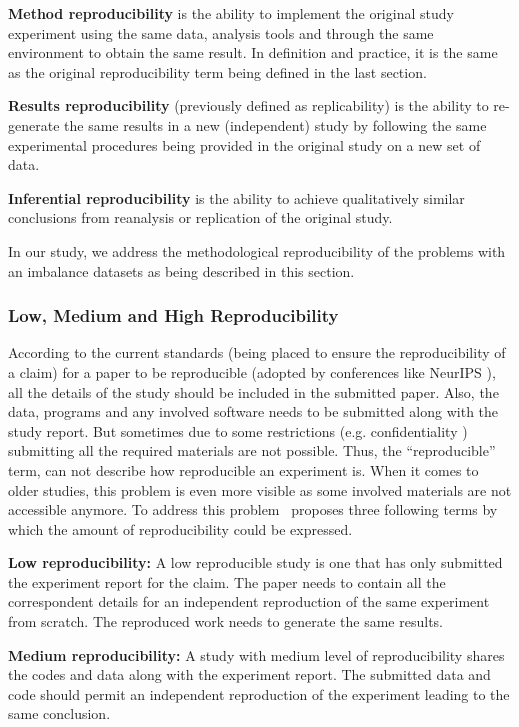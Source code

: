 \textbf{Method reproducibility} is the ability to implement the original study experiment using the same data, analysis tools and 
through the same environment to obtain the same result. In definition and practice, it is the same as the original 
reproducibility term being defined in the last section.

\textbf{Results reproducibility} (previously defined as replicability) is the ability to re-generate the same results in a new 
(independent) study by following the same experimental procedures being provided in the original study on a new set of data.

\textbf{Inferential reproducibility} is the ability to achieve qualitatively similar conclusions from reanalysis or replication of 
the original study.

In our study, we address the methodological reproducibility of the problems with an imbalance datasets as being described in 
this section.

\subsubsection{Low, Medium and High Reproducibility}
According to the current standards (being placed to ensure the reproducibility of a claim) for a paper to be 
reproducible (adopted by conferences like NeurIPS \cite{pineau_improving_2020}), all the details of the study should be 
included in the submitted paper. Also, the data, programs and any involved  software needs to be submitted along with 
the study report. But sometimes due to some restrictions (e.g. confidentiality \cite{dwork_fienberg_2018}) submitting all 
the required materials are not possible. Thus, the “reproducible” term, can not describe how reproducible an experiment is. 
When it comes to older studies, this problem is even more visible as some involved materials are not accessible anymore.
 To address this problem~\cite{tatman_practical_2018} proposes three following terms by which the amount of 
 reproducibility could be expressed.

\textbf{Low reproducibility:} A low reproducible study is one that has only submitted the experiment report for the claim. 
The paper needs to contain all the correspondent details for an independent reproduction of the same experiment from scratch. 
The reproduced work needs to generate the same results.

\textbf{Medium reproducibility:} A study with medium level of reproducibility shares the codes and data along with the 
experiment report. The submitted data and code should permit an independent reproduction of the experiment leading to 
the same conclusion.

